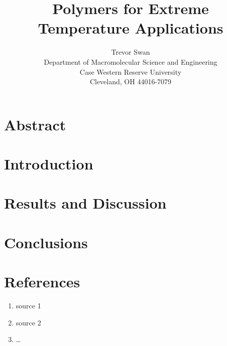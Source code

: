\documentclass[12pt]{article}
\title{Polymers for Extreme Temperature Applications}
\author{Trevor Swan \\
Department of Macromolecular Science and Engineering \\ 
Case Western Reserve University \\
Cleveland, OH 44016-7079}
\date{}
\begin{document}
\maketitle

\section{Abstract}
	\lipsum[1]
\section{Introduction}
	\lipsum[1]
\section{Results and Discussion}
	\lipsum[1]
\section{Conclusions}
	\lipsum[1]
\section{References}
	\begin{enumerate}
	
    \item source 1
    
	\item source 2
	
	\item \dots    
\end{enumerate}
\end{document}
